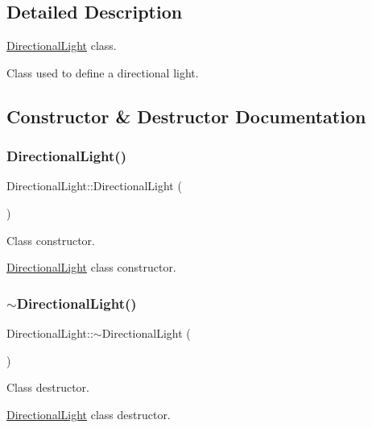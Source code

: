 \subsection{Detailed Description}
\hyperlink{class_directional_light}{Directional\+Light} class. 

Class used to define a directional light. 

\subsection{Constructor \& Destructor Documentation}
\mbox{\label{class_directional_light_a949b877ae041b9818f47eb812d80fa1b}} 
\subsubsection{\texorpdfstring{Directional\+Light()}{DirectionalLight()}}
{\footnotesize\ttfamily Directional\+Light\+::\+Directional\+Light (\begin{DoxyParamCaption}{ }\end{DoxyParamCaption})}



Class constructor. 

\hyperlink{class_directional_light}{Directional\+Light} class constructor. \mbox{\label{class_directional_light_ac4aca6c806e752c65ffea9b2f237b245}} 
\subsubsection{\texorpdfstring{$\sim$\+Directional\+Light()}{~DirectionalLight()}}
{\footnotesize\ttfamily Directional\+Light\+::$\sim$\+Directional\+Light (\begin{DoxyParamCaption}{ }\end{DoxyParamCaption})}



Class destructor. 

\hyperlink{class_directional_light}{Directional\+Light} class destructor. 

